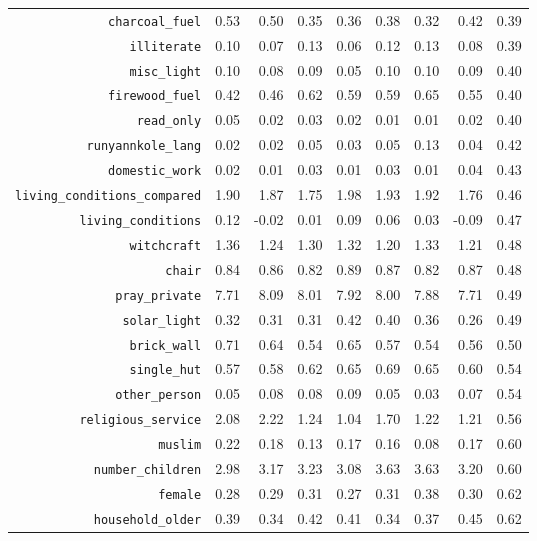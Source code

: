 \begin{longtable}{rrrrrrrrr}
  {\texttt{charcoal\_fuel}} & 0.53 & 0.50 & 0.35 & 0.36 & 0.38 & 0.32 & 0.42 & 0.39 \\ 
  {\texttt{illiterate}} & 0.10 & 0.07 & 0.13 & 0.06 & 0.12 & 0.13 & 0.08 & 0.39 \\ 
  {\texttt{misc\_light}} & 0.10 & 0.08 & 0.09 & 0.05 & 0.10 & 0.10 & 0.09 & 0.40 \\ 
  {\texttt{firewood\_fuel}} & 0.42 & 0.46 & 0.62 & 0.59 & 0.59 & 0.65 & 0.55 & 0.40 \\ 
  {\texttt{read\_only}} & 0.05 & 0.02 & 0.03 & 0.02 & 0.01 & 0.01 & 0.02 & 0.40 \\ 
  {\texttt{runyannkole\_lang}} & 0.02 & 0.02 & 0.05 & 0.03 & 0.05 & 0.13 & 0.04 & 0.42 \\ 
  {\texttt{domestic\_work}} & 0.02 & 0.01 & 0.03 & 0.01 & 0.03 & 0.01 & 0.04 & 0.43 \\ 
  {\texttt{living\_conditions\_compared}} & 1.90 & 1.87 & 1.75 & 1.98 & 1.93 & 1.92 & 1.76 & 0.46 \\ 
  {\texttt{living\_conditions}} & 0.12 & -0.02 & 0.01 & 0.09 & 0.06 & 0.03 & -0.09 & 0.47 \\ 
  {\texttt{witchcraft}} & 1.36 & 1.24 & 1.30 & 1.32 & 1.20 & 1.33 & 1.21 & 0.48 \\ 
  {\texttt{chair}} & 0.84 & 0.86 & 0.82 & 0.89 & 0.87 & 0.82 & 0.87 & 0.48 \\ 
  {\texttt{pray\_private}} & 7.71 & 8.09 & 8.01 & 7.92 & 8.00 & 7.88 & 7.71 & 0.49 \\ 
  {\texttt{solar\_light}} & 0.32 & 0.31 & 0.31 & 0.42 & 0.40 & 0.36 & 0.26 & 0.49 \\ 
  {\texttt{brick\_wall}} & 0.71 & 0.64 & 0.54 & 0.65 & 0.57 & 0.54 & 0.56 & 0.50 \\ 
  {\texttt{single\_hut}} & 0.57 & 0.58 & 0.62 & 0.65 & 0.69 & 0.65 & 0.60 & 0.54 \\ 
  {\texttt{other\_person}} & 0.05 & 0.08 & 0.08 & 0.09 & 0.05 & 0.03 & 0.07 & 0.54 \\ 
  {\texttt{religious\_service}} & 2.08 & 2.22 & 1.24 & 1.04 & 1.70 & 1.22 & 1.21 & 0.56 \\ 
  {\texttt{muslim}} & 0.22 & 0.18 & 0.13 & 0.17 & 0.16 & 0.08 & 0.17 & 0.60 \\ 
  {\texttt{number\_children}} & 2.98 & 3.17 & 3.23 & 3.08 & 3.63 & 3.63 & 3.20 & 0.60 \\ 
  {\texttt{female}} & 0.28 & 0.29 & 0.31 & 0.27 & 0.31 & 0.38 & 0.30 & 0.62 \\ 
  {\texttt{household\_older}} & 0.39 & 0.34 & 0.42 & 0.41 & 0.34 & 0.37 & 0.45 & 0.62 \\ 

\end{longtable}
